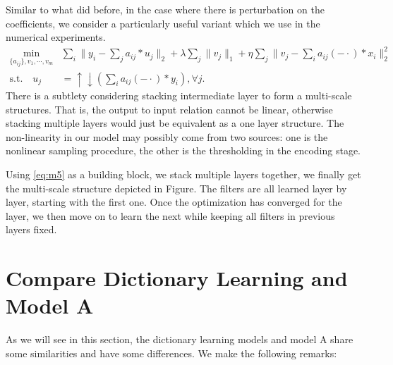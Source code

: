 \documentclass[a4paper]{article}
\begin{document}
Similar to what did before, in the case where there is perturbation on the coefficients, we consider a particularly useful variant which we use in the numerical experiments.
\begin{equation}
\label{eq:m5}
\begin{aligned}
	\min_{\{a_{ij}\}, v_1,\cdots,v_m}& \sum_i \|y_i - \sum_j a_{ij}*u_j\|_2 +\lambda \sum_j \|v_j\|_1 + \eta \sum_j \|v_j-  \sum_{i} a_{ij}(-\cdot)*x_i \|_2^2\\
	 \textrm{s.t.}  	\quad 	u_j&=\uparrow\downarrow(\sum_i a_{ij}(-\cdot)*y_i), \forall j.
	\end{aligned}
\end{equation}
There is a subtlety considering stacking intermediate layer to form a multi-scale structures. That is, the output to input relation cannot be linear, otherwise stacking multiple layers would just be equivalent as a one layer structure. The non-linearity in our model may possibly come from two sources: one is the nonlinear sampling procedure, the other is the thresholding in the encoding stage.

Using \eqref{eq:m5} as a building block, we stack multiple layers together, we finally get the multi-scale structure depicted in Figure. The filters are all learned layer by layer, starting with the first one. Once the optimization has converged for the layer, we then move on to learn the next while keeping all filters in previous layers fixed.
\newpage
\section{Compare Dictionary Learning and Model A}
As we will see in this section, the dictionary learning models and model A share some similarities and have some differences. We make the following remarks: 
\end{document}
